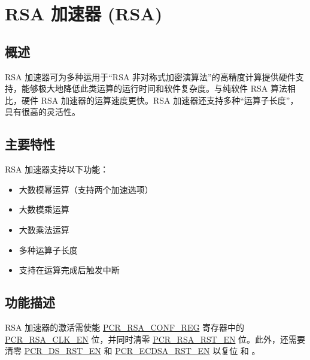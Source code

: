 \documentclass[main\_\_CN.tex]{subfiles}
\begin{document}

\ifglobal
\else
    \listoftodos
    {\let\clearpage\relax \listofdonetodos}
    \tableofcontents
\fi



\hypertarget{rsa}{}
\chapter{RSA 加速器 (RSA)}\label{mod:rsa}

\section{概述}

RSA 加速器可为多种运用于“RSA 非对称式加密演算法”的高精度计算提供硬件支持，能够极大地降低此类运算的运行时间和软件复杂度。与纯软件 RSA 算法相比，硬件 RSA 加速器的运算速度更快。RSA 加速器还支持多种“运算子长度”，具有很高的灵活性。

\section{主要特性}

RSA 加速器支持以下功能：
\begin{itemize}
    \item 大数模幂运算（支持两个加速选项）
    \item 大数模乘运算
    \item 大数乘法运算
    \item 多种运算子长度
    \item 支持在运算完成后触发中断
\end{itemize}


\section{功能描述}\label{sec:rsa-func-desc}

RSA 加速器的激活需使能 \hyperref[regdesc:PCRRSACONFREG]{PCR\_RSA\_CONF\_REG} 寄存器中的 \hyperref[fielddesc:PCRRSACLKEN]{PCR\_RSA\_CLK\_EN} 位，并同时清零 \hyperref[fielddesc:PCRRSARSTEN]{PCR\_RSA\_RST\_EN} 位。此外，还需要清零 \hyperref[fielddesc:PCRDSRSTEN]{PCR\_DS\_RST\_EN} 和 \hyperref[fielddesc:PCRECDSARSTEN]{PCR\_ECDSA\_RST\_EN} 以复位  和 。
\end{document}

